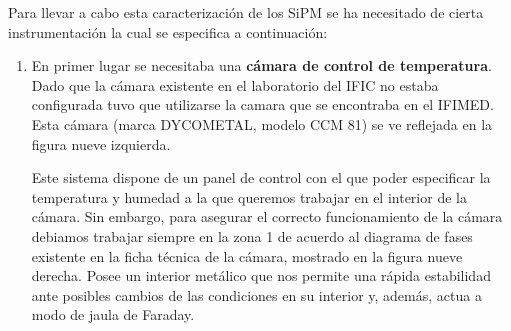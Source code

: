 Para llevar a cabo esta caracterización de los SiPM se ha necesitado de cierta instrumentación la cual se especifica a continuación:

\begin{enumerate}
\item {} En primer lugar se necesitaba una \textbf{cámara de control de temperatura}. 
\newline
Dado que la cámara existente en el laboratorio del IFIC no estaba configurada tuvo que utilizarse la camara que se encontraba en el IFIMED. Esta cámara (marca DYCOMETAL, modelo CCM 81) se ve reflejada en la figura nueve izquierda.

Este sistema dispone de un panel de control con el que poder especificar la temperatura y humedad a la que queremos trabajar en el interior de la cámara. Sin embargo, para asegurar el correcto funcionamiento de la cámara debiamos trabajar siempre en la zona 1 de acuerdo al diagrama de fases existente en la ficha técnica de la cámara, mostrado en la figura nueve derecha. Posee un interior metálico que nos permite una rápida estabilidad ante posibles cambios de las condiciones en su interior y, además, actua a modo de jaula de Faraday. 


\end{enumerate}
